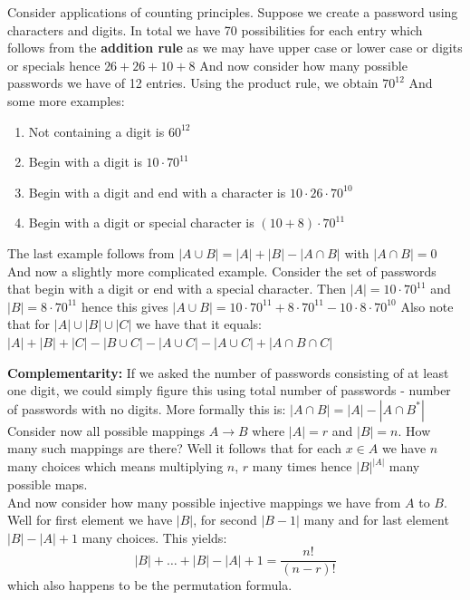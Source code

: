 \documentclass[titlepage]{article}
\theoremstyle{definition}
\numberwithin{equation}{subsection}
\numberwithin{remark}{subsection}
\begin{document}
Consider applications of counting principles. Suppose we create a password using characters and digits. In total we have 70 possibilities for each entry which follows from the \textbf{addition rule} as we may have upper case or lower case or digits or specials hence $26+26+10+8$ And now consider how many possible passwords we have of 12 entries. Using the product rule, we obtain $70^{12}$ And some more examples:

\begin{enumerate}
    \item Not containing a digit is $60^{12}$
    \item Begin with a digit is $10 \cdot 70^{11}$
    \item Begin with a digit and end with a character is $10 \cdot 26 \cdot 70^{10}$
    \item Begin with a digit or special character is $(10 + 8) \cdot 70^{11}$
\end{enumerate}

The last example follows from $|A\cup B| = |A| + |B| - |A\cap B|$ with $|A\cap B| = 0$ And now a slightly more complicated example. Consider the set of passwords that begin with a digit or end with a special character. Then $|A| = 10 \cdot 70^{11}$ and $|B| = 8 \cdot 70^{11}$ hence this gives $|A\cup B| = 10 \cdot 70^{11} + 8 \cdot 70^{11} - 10\cdot 8 \cdot70^{10}$ Also note that for $|A| \cup |B| \cup |C|$ we have that it equals: $|A| + |B| + |C| - |B\cup C| - |A\cup C| - |A\cup C| + |A\cap B \cap C|$

\textbf{Complementarity:} If we asked the number of passwords consisting of at least one digit, we could simply figure this using total number of passwords - number of passwords with no digits. More formally this is: $|A \cap B| = |A| - |A\cap B^{*}|$
\\

Consider now all possible mappings $A \to B$ where $|A| = r$ and $|B| = n$. How many such mappings are there? Well it follows that for each $x \in A$ we have $n$ many choices which means multiplying $n$,  $r$ many times hence $|B|^{|A|}$ many possible maps.
\\

And now consider how many possible injective mappings we have from $A$ to $B$. Well for first element we have $|B|$, for second $|B-1|$ many and for last element $|B|-|A|+1$ many choices. This yields:
$$ |B| + \ldots + |B|-|A|+1 = \frac{n!}{(n-r)!} $$
which also happens to be the permutation formula. 
\end{document}
